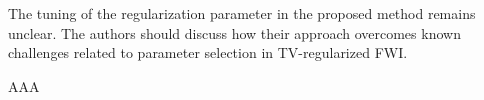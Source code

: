 \begin{point}
	The tuning of the regularization parameter in the proposed method remains unclear. The authors should discuss how their approach overcomes known challenges related to parameter selection in TV-regularized FWI.
\end{point}

\begin{reply}
	AAA
\end{reply}

